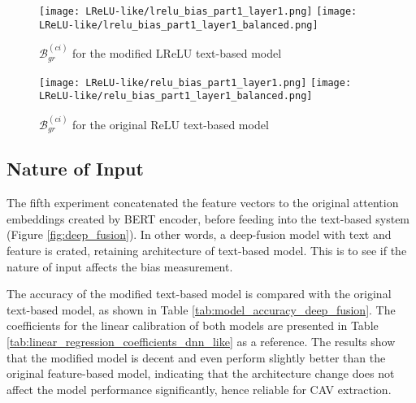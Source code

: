 \begin{figure}[H]
    \centering
    \begin{minipage}[t]{0.48\textwidth}
        \centering
        \texttt{[image: LReLU-like/lrelu\_bias\_part1\_layer1.png]}
        \hfill
        \texttt{[image: LReLU-like/lrelu\_bias\_part1\_layer1\_balanced.png]}
        \caption{$\mathcal{B}^{(ci)}_{gr}$ for the modified LReLU text-based model}
        \label{fig:gradient_distance_lrelu_text}
    \end{minipage}
    \hfill
    \begin{minipage}[t]{0.48\textwidth}
        \centering
        \texttt{[image: LReLU-like/relu\_bias\_part1\_layer1.png]}
        \hfill
        \texttt{[image: LReLU-like/relu\_bias\_part1\_layer1\_balanced.png]}
        \caption{$\mathcal{B}^{(ci)}_{gr}$ for the original ReLU text-based model}
        \label{fig:gradient_distance_relu_text}
    \end{minipage}
\end{figure}

\subsection{Nature of Input}
The fifth experiment concatenated the feature vectors to the original attention embeddings created by BERT encoder, before feeding into the text-based system (Figure \ref{fig:deep_fusion}). In other words, a deep-fusion model with text and feature is crated, retaining architecture of text-based model. This is to see if the nature of input affects the bias measurement.

The accuracy of the modified text-based model is compared with the original text-based model, as shown in Table \ref{tab:model_accuracy_deep_fusion}. The coefficients for the linear calibration of both models are presented in Table \ref{tab:linear_regression_coefficients_dnn_like} as a reference. The results show that the modified model is decent and even perform slightly better than the original feature-based model, indicating that the architecture change does not affect the model performance significantly, hence reliable for CAV extraction.

